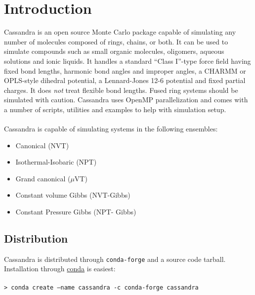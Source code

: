 \chapter{Introduction}
Cassandra is an open source Monte Carlo package capable of simulating
any number of molecules composed of rings, chains, or both. It can be
used to simulate compounds such as small organic molecules, oligomers,
aqueous solutions and ionic liquids. It handles a standard ``Class
I''-type force field having fixed bond lengths, harmonic bond angles
and improper angles, a CHARMM or OPLS-style dihedral potential, a
Lennard-Jones 12-6 potential and fixed partial charges. It does {\em
  not} treat flexible bond lengths. Fused ring systems should
  be simulated with caution. Cassandra uses OpenMP parallelization and comes
with a number of scripts, utilities and examples to help with
simulation setup. \\ \\ 
%
Cassandra is capable of simulating systems in the following ensembles: \\ 
%
\begin{itemize}
\item Canonical (NVT) 
\item Isothermal-Isobaric (NPT) 
\item Grand canonical ($\mu$VT) 
\item Constant volume Gibbs (NVT-Gibbs) 
\item Constant Pressure Gibbs (NPT- Gibbs)
\end{itemize}

\section{Distribution}
Cassandra is distributed through \texttt{conda-forge} and a source code tarball. Installation
through \href{https://docs.conda.io/en/latest/miniconda.html}{conda} is easiest: \\ \\
%
\texttt{> conda create --name cassandra -c conda-forge cassandra} \\
%

